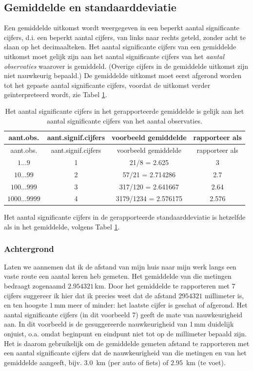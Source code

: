 \documentclass[
]{book}
\begin{document}
\hypertarget{sec:significantecijfers-gemiddelde}{%
\subsection{Gemiddelde en standaarddeviatie}\label{sec:significantecijfers-gemiddelde}}

Een gemiddelde uitkomst wordt weergegeven in een beperkt aantal
significante cijfers, d.i. een beperkt aantal cijfers, van links naar
rechts geteld, zonder acht te slaan op het decimaalteken. Het aantal
significante cijfers van een gemiddelde uitkomst moet gelijk zijn aan
het aantal significante cijfers van het \emph{aantal observaties} waarover is
gemiddeld. (Overige cijfers in de gemiddelde uitkomst zijn niet
nauwkeurig bepaald.) De gemiddelde uitkomst moet eerst afgerond worden
tot het gepaste aantal significante cijfers, voordat de uitkomst verder
geïnterpreteerd wordt, zie
Tabel \ref{tab:signifcijfersgemiddelde}.

\begin{longtable}[]{@{}cccc@{}}
\caption{\label{tab:signifcijfersgemiddelde} Het aantal significante cijfers in het gerapporteerde gemiddelde is gelijk aan het aantal significante cijfers van het aantal observaties.}\tabularnewline
\toprule
aant.obs. & aant.signif.cijfers & voorbeeld gemiddelde & rapporteer als\tabularnewline
\midrule
\endfirsthead
\toprule
aant.obs. & aant.signif.cijfers & voorbeeld gemiddelde & rapporteer als\tabularnewline
\midrule
\endhead
\(1\dots9\) & 1 & 21/8 = 2.625 & 3\tabularnewline
\(10\dots99\) & 2 & 57/21 = 2.714286 & 2.7\tabularnewline
\(100\dots999\) & 3 & 317/120 = 2.641667 & 2.64\tabularnewline
\(1000\dots9999\) & 4 & 3179/1234 = 2.576175 & 2.576\tabularnewline
\bottomrule
\end{longtable}

Het aantal significante cijfers in de gerapporteerde standaarddeviatie
is hetzelfde als in het gemiddelde, volgens
Tabel \ref{tab:signifcijfersgemiddelde}.

\hypertarget{achtergrond}{%
\subsubsection{Achtergrond}\label{achtergrond}}

Laten we aannemen dat ik de afstand van mijn huis naar mijn werk langs
een vaste route een aantal keren heb gemeten. Het gemiddelde van die
metingen bedraagt zogenaamd \(2.954321\) km. Door het gemiddelde te
rapporteren met 7 cijfers suggereer ik hier dat ik precies weet dat de
afstand \(2954321\) millimeter is, en ten hoogste \(1\) mm meer of minder:
het laatste cijfer is geschat of afgerond. Het aantal significante
cijfers (in dit voorbeeld 7) geeft de mate van nauwkeurigheid aan. In
dit voorbeeld is de gesuggereerde nauwkeurigheid van 1 mm duidelijk
onjuist, o.a. omdat beginpunt en eindpunt niet tot op de millimeter
bepaald zijn. Het is daarom gebruikelijk om de gemiddelde gemeten
afstand te rapporteren met een aantal significante cijfers dat de
nauwkeurigheid van die metingen en van het gemiddelde aangeeft, bijv.
\(3.0\)~km (per auto of fiets) of \(2.95\)~km (te voet).
\end{document}
